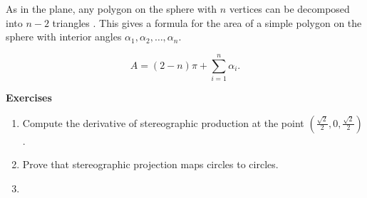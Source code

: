 As in the plane, any polygon on the sphere with $n$ vertices can be decomposed
into $n-2$ triangles \cite{orourke_computational_1994}. This gives a formula for the area of a simple polygon
on the sphere with interior angles $\alpha_1,\alpha_2,\ldots, \alpha_n$.

\begin{equation} \label{eqn:sphere-area}
	A=(2-n)\pi +\sum_{i=1}^n \alpha_i.
\end{equation}



\noindent \textbf{Exercises}


\begin{enumerate}
	\item Compute the derivative of stereographic production at the point $(\frac{\sqrt{2}}{2},0,\frac{\sqrt{2}}{2})$.
	
	\item Prove that stereographic projection maps circles to circles.
	
	\item 
	
\end{enumerate}

\pagebreak